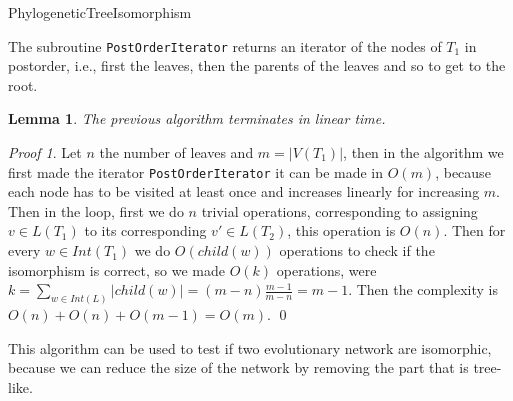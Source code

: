 \documentclass[12pt,a4paper]{book}
\theoremstyle{plain}
\newtheorem{lema}{Lemma}
\theoremstyle{definition}
\theoremstyle{remark}
\newtheorem*{Proof}{Proof}
\begin{document}
\begin{algorithm}\label{PhyTreeIso}\hypertarget{PhyTreeIso}{}
 
\caption{PhylogeneticTreeIsomorphism} 

\end{algorithm}

The subroutine \texttt{PostOrderIterator} returns an iterator of the nodes of $T_1$ in postorder, i.e., first the leaves, then the parents of the leaves
and so to get to the root.

\begin{lema}
 The previous algorithm terminates in linear time.
\end{lema}
\begin{Proof}
 Let $n$ the number of leaves and $m = | V(T_1)|$, then in the algorithm we first made the iterator \texttt{PostOrderIterator} it can be made in 
$O(m)$, because each node has to be visited at least once and increases linearly for increasing $m$. Then in the loop, first we do $n$ trivial operations, 
corresponding to assigning $v \in L(T_1)$ to its corresponding $v' \in L(T_2)$, this operation is $O(n)$. Then for every $w \in Int(T_1)$ we 
do $O( child(w))$ operations to check if the isomorphism is correct, so we made $O(k)$ operations, were $k =\displaystyle\sum_{w \in Int(L)} 
| child(w)| = (m-n) \frac{ m-1}{m-n} = m-1$. Then the complexity is $O(n) + O(n) + O(m-1) = O(m)$.
\qed  \end{Proof}

This algorithm can be used to test if two evolutionary network are isomorphic, because we can reduce the size of the network by removing the part 
that is tree-like.
\end{document}
